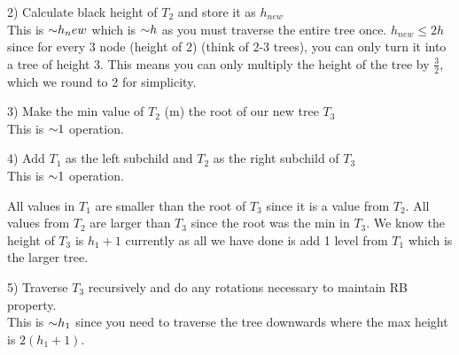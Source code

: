 \begin{problem}
\begin{questions}
2) Calculate black height of $T_2$ and store it as $h_{new}$\\
This is $\mathord{\sim}h_new$ which is $\mathord{\sim}h$ as you must traverse the entire tree once. $h_{new} \leq 2h$ since for every 3 node (height of 2) (think of 2-3 trees), you can only turn it into a tree of height 3. This means you can only multiply the height of the tree by $\frac{3}{2}$, which we round to 2 for simplicity. 

3) Make the min value of $T_2$ (m) the root of our new tree $T_3$\\
This is $\mathord{\sim}1$ operation.

4) Add $T_1$ as the left subchild and $T_2$ as the right subchild of $T_3$\\
This is $\mathord{\sim}1$ operation.

All values in $T_1$ are smaller than the root of $T_3$ since it is a value from $T_2$. All values from $T_2$ are larger than $T_3$ since the root was the min in $T_3$.
We know the height of $T_3$ is $h_1+1$ currently as all we have done is add 1 level from $T_1$ which is the larger tree.

5) Traverse $T_3$ recursively and do any rotations necessary to maintain RB property.\\
This is $\mathord{\sim}h_1$ since you need to traverse the tree downwards where the max height is $2(h_1+1)$.

\end{questions}
\end{problem}


